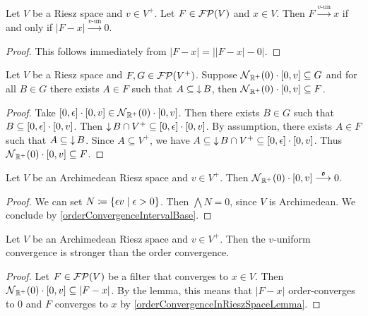 \begin{lemma} \label{uniformRieszConvergenceAbsoluteValueConvergenceLemma}
Let $V$ be a Riesz space and $v\in V^+$. Let $F\in \operatorname{\mathcal{FP}}(V)$ and $x\in V$. Then $F\overset{\text{$v$-un}}{\longrightarrow} x$ \textup{if and only if} $|F-x|\overset{\text{$v$-un}}{\longrightarrow} 0$.
\end{lemma}
\begin{proof}
This follows immediately from $|F-x| = \big||F-x|-0\big|$.
\end{proof}

\begin{lemma} \label{filterGreaterThanRieszUniformNeighbourhoodLemma}
Let $V$ be a Riesz space and $F,G\in\operatorname{\mathcal{FP}}(V^+)$. Suppose $\neighbourhood_{\R^+}(0)\cdot \interval{0,v} \subseteq G$ and for all $B\in G$ there exists $A\in F$ such that $A\subseteq \operatorname{\downarrow} B$, then $\neighbourhood_{\R^+}(0)\cdot \interval{0,v} \subseteq F$.
\end{lemma}
\begin{proof}
Take $\interval{0,\epsilon} \cdot \interval{0,v} \in \neighbourhood_{\R^+}(0)\cdot \interval{0,v}$. Then there exists $B\in G$ such that $B\subseteq \interval{0,\epsilon} \cdot \interval{0,v}$. Then $\downset B \cap V^+ \subseteq \interval{0,\epsilon} \cdot \interval{0,v}$. By assumption, there exists $A\in F$ such that $A\subseteq \operatorname{\downarrow} B$. Since $A\subseteq V^+$, we have $A\subseteq \downset B \cap V^+ \subseteq \interval{0,\epsilon} \cdot \interval{0,v}$. Thus $\neighbourhood_{\R^+}(0)\cdot \interval{0,v} \subseteq F$.
\end{proof}

\begin{lemma}
Let $V$ be an Archimedean Riesz space and $v\in V^+$. Then $\neighbourhood_{\R^+}(0)\cdot \interval{0,v} \overset{\mathfrak{o}}{\longrightarrow} 0$.
\end{lemma}
\begin{proof}
We can set $N \defeq \setbuilder{\epsilon v}{\epsilon > 0}$. Then $\bigwedge N = 0$, since $V$ is Archimedean. We conclude by \ref{orderConvergenceIntervalBase}.
\end{proof}
\begin{corollary}
Let $V$ be an Archimedean Riesz space and $v\in V^+$. Then the $v$-uniform convergence is stronger than the order convergence.
\end{corollary}
\begin{proof}
Let $F\in \operatorname{\mathcal{FP}}(V)$ be a filter that converges to $x\in V$. Then $\neighbourhood_{\R^+}(0)\cdot \interval{0,v} \subseteq |F - x|$. By the lemma, this means that $|F-x|$ order-converges to $0$ and $F$ converges to $x$ by \ref{orderConvergenceInRieszSpaceLemma}.
\end{proof}


